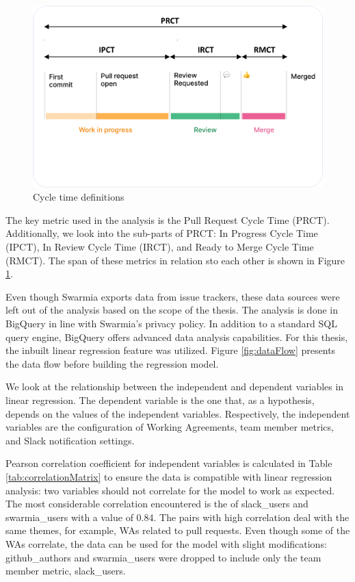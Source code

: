 \begin{figure}[ht]
    \begin{center}
        \includegraphics[width=13.5cm]{LaTeX/images/cts-defined-arrows.png}
        \caption{Cycle time definitions}
        \label{fig:ctsArrows}
    \end{center}
\end{figure}

The key metric used in the analysis is the Pull Request Cycle Time (PRCT). Additionally, we look into the sub-parts of PRCT: In Progress Cycle Time (IPCT), In Review Cycle Time (IRCT), and Ready to Merge Cycle Time (RMCT). The span of these metrics in relation sto each other is shown in Figure \ref{fig:ctsArrows}. 

Even though Swarmia exports data from issue trackers, these data sources were left out of the analysis based on the scope of the thesis. The analysis is done in BigQuery in line with Swarmia's privacy policy. In addition to a standard SQL query engine, BigQuery offers advanced data analysis capabilities. For this thesis, the inbuilt linear regression feature was utilized. Figure \ref{fig:dataFlow} presents the data flow before building the regression model. 

We look at the relationship between the independent and dependent variables in linear regression. The dependent variable is the one that, as a hypothesis, depends on the values of the independent variables. Respectively, the independent variables are the configuration of Working Agreements, team member metrics, and Slack notification settings. 



Pearson correlation coefficient for independent variables is calculated in Table \ref{tab:correlationMatrix} to ensure the data is compatible with linear regression analysis: two variables should not correlate for the model to work as expected. The most considerable correlation encountered is the of slack\_users and swarmia\_users with a value of 0.84. The pairs with high correlation deal with the same themes, for example, WAs related to pull requests. Even though some of the WAs correlate, the data can be used for the model with slight modifications: github\_authors and swarmia\_users were dropped to include only the team member metric, slack\_users. 

